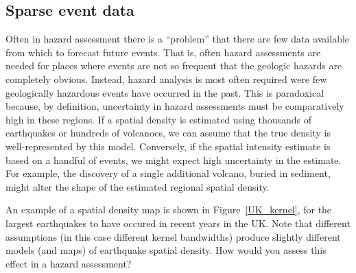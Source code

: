 \documentclass[10pt]{article}
\begin{document}
\subsection{Sparse event data}
Often in hazard assessment there is a ``problem'' that there are few data available from which to forecast future events. That is, often hazard assessments are needed for places where events are not so frequent that the geologic hazards are completely obvious. Instead, hazard analysis is most often required were few geologically hazardous events have occurred in the past. This is paradoxical because, by definition, uncertainty in hazard assessments must be comparatively high in these regions. If a spatial density is estimated using thousands of earthquakes or hundreds of volcanoes, we can assume that the true density is well-represented by this model. Conversely, if the spatial intensity estimate is based on a handful of events, we might expect high uncertainty in the estimate. For example, the discovery of a single additional volcano, buried in sediment, might alter the shape of the estimated regional spatial density.

An example of a spatial density map is shown in Figure~\ref{UK_kernel}, for the largest earthquakes to have occured in recent years in the UK. Note that different assumptions (in this case different kernel bandwidths) produce slightly different models (and maps) of earthquake spatial density. How would you assess this effect in a hazard assessment?
\end{document}
